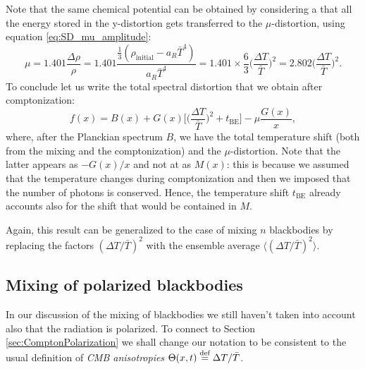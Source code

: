 Note that the same chemical potential can be obtained by considering a that all the energy stored in the y-distortion gets transferred to the $\mu$-distortion, using equation \eqref{eq:SD_mu_amplitude}:$$\mu=1.401\frac{\Delta \rho}{\rho}=1.401\frac{\frac{1}{3}(\rho_\text{initial}-a_R \bar T^4)}{a_R \bar T^4}=1.401\times\frac{6}{3}\bigg(\frac{\Delta T}{\bar T}\bigg)^2=2.802\bigg(\frac{\Delta T}{\bar T}\bigg)^2.$$
To conclude let us write the total spectral distortion that we obtain after comptonization:
$$f(x)=B(x)+G(x)\bigg[\bigg(\frac{\Delta T}{\bar T}\bigg)^2+t_\text{BE}\bigg]-\mu\frac{G(x)}{x},$$
where, after the Planckian spectrum $B$, we have the total temperature shift (both from the mixing and the comptonization) and the $\mu$-distortion. Note that the latter appears as $-G(x)/x$ and not at as $M(x)$: this is because we assumed that the temperature changes during comptonization and then we imposed that the number of photons is conserved. Hence, the temperature shift $t_\text{BE}$ already accounts also for the shift that would be contained in $M$.

Again, this result can be generalized to the case of mixing $n$ blackbodies by replacing the factors $(\Delta T /\bar T)^2$ with the ensemble average $\langle(\Delta T /\bar T)^2\rangle$.

\subsection{Mixing of polarized blackbodies}
\label{sec:MixingPolarization}
In our discussion of the mixing of blackbodies we still haven't taken into account also that the radiation is polarized. To connect to Section \ref{sec:ComptonPolarization} we shall change our notation to be consistent to the usual definition of \emph{CMB anisotropies} $\Theta(x,t)\stackrel{\text{def}}{=} \Delta T/\bar T$.

